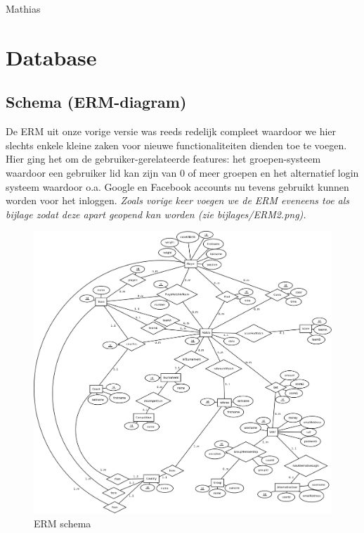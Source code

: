 \documentclass[11pt]{article}
\begin{document}
Mathias




\section{Database}

\subsection{Schema (ERM-diagram)}

De ERM uit onze vorige versie was reeds redelijk compleet waardoor we hier slechts enkele kleine zaken voor nieuwe functionaliteiten dienden toe te voegen.\\
Hier ging het om de gebruiker-gerelateerde features: het groepen-systeem waardoor een gebruiker lid kan zijn van 0 of meer groepen en het alternatief login systeem waardoor o.a. Google en Facebook accounts nu tevens gebruikt kunnen worden voor het inloggen.  \emph{Zoals vorige keer voegen we de ERM eveneens toe als bijlage zodat deze apart geopend kan worden (zie bijlages/ERM2.png).}

\begin{figure}[h!]
	\begin{center}
	\includegraphics[scale=0.11]{ERM2.png}

	\caption{ERM schema}
	\label{fig:speler}
	\end{center}
\end{figure}
\end{document}
